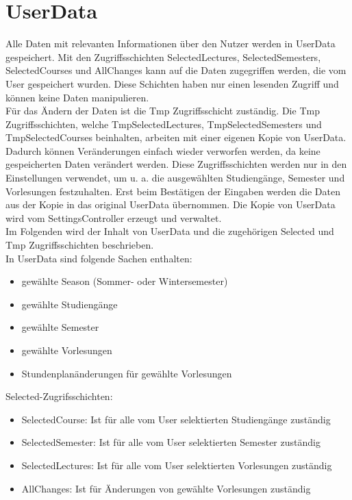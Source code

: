 \newpage

\section{UserData}
Alle Daten mit relevanten Informationen über den Nutzer werden in UserData gespeichert. Mit den Zugriffsschichten SelectedLectures, SelectedSemesters, SelectedCourses und AllChanges kann auf die Daten zugegriffen werden, die vom User gespeichert wurden. Diese Schichten haben nur einen lesenden Zugriff und können keine Daten manipulieren. \\

Für das Ändern der Daten ist die Tmp Zugriffsschicht zuständig. Die Tmp Zugriffsschichten, welche TmpSelectedLectures, TmpSelectedSemesters und TmpSelectedCourses beinhalten, arbeiten mit einer eigenen Kopie von UserData. Dadurch können Veränderungen einfach wieder verworfen werden, da keine gespeicherten Daten verändert werden. Diese Zugriffsschichten werden nur in den Einstellungen verwendet, um u. a. die ausgewählten Studiengänge, Semester und Vorlesungen festzuhalten. Erst beim Bestätigen der Eingaben werden die Daten aus der Kopie in das original UserData übernommen. Die Kopie von UserData wird vom SettingsController erzeugt und verwaltet.\\

Im Folgenden wird der Inhalt von UserData und die zugehörigen Selected und Tmp Zugriffsschichten beschrieben.\\

In UserData sind folgende Sachen enthalten:
\begin{itemize}
     \item gewählte Season (Sommer- oder Wintersemester)
     \item gewählte Studiengänge
     \item gewählte Semester
     \item gewählte Vorlesungen
     \item Stundenplanänderungen für gewählte Vorlesungen\\     
\end{itemize}

Selected-Zugrifsschichten: 
\begin{itemize}
     \item SelectedCourse: Ist für alle vom User selektierten Studiengänge zuständig
     \item SelectedSemester: Ist für alle vom User selektierten Semester zuständig
     \item SelectedLectures: Ist für alle vom User selektierten Vorlesungen zuständig
     \item AllChanges: Ist für Änderungen von gewählte Vorlesungen zuständig \\
\end{itemize}

